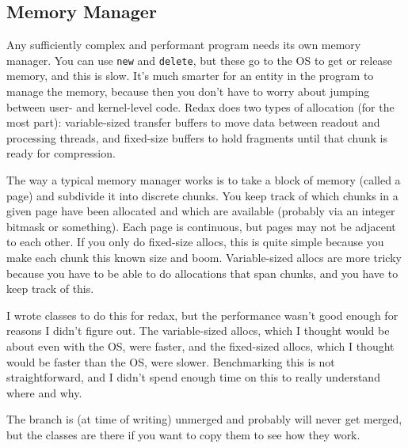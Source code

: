 \subsection{Memory Manager}

Any sufficiently complex and performant program needs its own memory manager.
You can use \texttt{new} and \texttt{delete}, but these go to the OS to get or release memory, and this is slow.
It's much smarter for an entity in the program to manage the memory, because then you don't have to worry about jumping between user- and kernel-level code.
Redax does two types of allocation (for the most part): variable-sized transfer buffers to move data between readout and processing threads, and fixed-size buffers to hold fragments until that chunk is ready for compression.

The way a typical memory manager works is to take a block of memory (called a page) and subdivide it into discrete chunks.
You keep track of which chunks in a given page have been allocated and which are available (probably via an integer bitmask or something).
Each page is continuous, but pages may not be adjacent to each other.
If you only do fixed-size allocs, this is quite simple because you make each chunk this known size and boom.
Variable-sized allocs are more tricky because you have to be able to do allocations that span chunks, and you have to keep track of this.

I wrote classes to do this for redax, but the performance wasn't good enough for reasons I didn't figure out.
The variable-sized allocs, which I thought would be about even with the OS, were faster, and the fixed-sized allocs, which I thought would be faster than the OS, were slower.
Benchmarking this is not straightforward, and I didn't spend enough time on this to really understand where and why.

The branch is (at time of writing) unmerged and probably will never get merged, but the classes are there if you want to copy them to see how they work.

